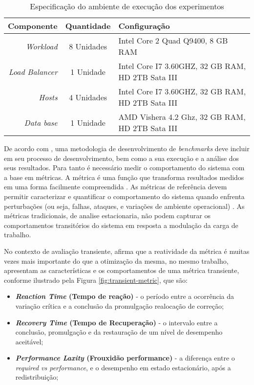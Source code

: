 \begin{table}[htb]
	\centering
	\caption{Especificação do ambiente de execução dos experimentos}
	\label{tab:configuracao_maquinas}
	\begin{tabularx}{\textwidth}{|r|c|X|} \hline\hline
		\textbf{Componente}    & \textbf{Quantidade} & \textbf{Configuração} \\ \hline
		\textit{Workload}      & 8 Unidades          & Intel Core 2 Quad Q9400, 8 GB RAM  \\
		\textit{Load Balancer} & 1 Unidade           & Intel Core I7 3.60GHZ, 32 GB RAM, HD 2TB Sata III \\
		\textit{Hosts}         & 4 Unidades          & Intel Core I7 3.60GHZ, 32 GB RAM, HD 2TB Sata III\\
		\textit{Data base}     & 1 Unidade           & AMD Vishera 4.2 Ghz, 32 GB RAM, HD 2TB Sata III \\
		\hline
	\end{tabularx}
	\fdadospesquisa
\end{table}


De acordo com , uma metodologia de desenvolvimento de \textit{benchmarks} deve incluir em seu processo de desenvolvimento, bem como a sua execução e a análise dos seus resultados. Para tanto é necessário medir o comportamento do sistema com a base em métricas. A métrica é uma função que transforma resultados medidos em uma forma facilmente compreendida \cite{Folkerts2013}. As métricas de referência devem permitir caracterizar e quantificar o comportamento do sistema quando enfrenta perturbações (ou seja, falhas, ataques, e variações de ambiente operacional) \cite{Marco2012}. As métricas tradicionais, de analise estacionaria, não podem capturar os comportamentos transitórios do sistema em resposta a modulação da carga de trabalho.

No contexto de avaliação transiente,  afirma que a reatividade da métrica é muitas vezes mais importante do que a otimização da mesma, no mesmo trabalho,  apresentam as características e os comportamentos de uma métrica transiente, conforme ilustrado pela Figura \ref{fig:transient-metric}, que são: 
\begin{itemize}
	\item \textbf{\textit{Reaction Time} (Tempo de reação)} - o período entre a ocorrência da variação crítica e a conclusão da promulgação realocação de correção;
	
	\item \textbf{\textit{Recovery Time} (Tempo de Recuperação)} - o intervalo entre a conclusão, promulgação e da restauração de um nível de desempenho aceitável;
	
	\item \textbf{\textit{Performance Laxity} (Frouxidão performance)} - a diferença entre o \textit{required vs performance}, e o desempenho em estado estacionário, após a redistribuição;
\end{itemize}


